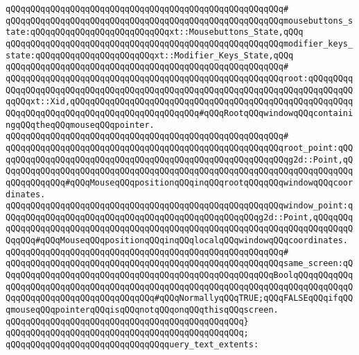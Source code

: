 \verb|qQQqqQQqqQQqqQQqqQQqqQQqqQQqqQQqqQQqqQQqqQQqqQQqqQQqqQQq#|\newline
\verb|qQQqqQQqqQQqqQQqqQQqqQQqqQQqqQQqqQQqqQQqqQQqqQQqqQQqqQQqmousebuttons_state:qQQqqQQqqQQqqQQqqQQqqQQqqQQqxt::Mousebuttons_State,qQQq|\newline
\verb|qQQqqQQqqQQqqQQqqQQqqQQqqQQqqQQqqQQqqQQqqQQqqQQqqQQqqQQqmodifier_keys_state:qQQqqQQqqQQqqQQqqQQqqQQqxt::Modifier_Keys_State,qQQq|\newline
\verb|qQQqqQQqqQQqqQQqqQQqqQQqqQQqqQQqqQQqqQQqqQQqqQQqqQQqqQQq#|\newline
\verb|qQQqqQQqqQQqqQQqqQQqqQQqqQQqqQQqqQQqqQQqqQQqqQQqqQQqqQQqroot:qQQqqQQqqQQqqQQqqQQqqQQqqQQqqQQqqQQqqQQqqQQqqQQqqQQqqQQqqQQqqQQqqQQqqQQqqQQqqQQqqQQqxt::Xid,qQQqqQQqqQQqqQQqqQQqqQQqqQQqqQQqqQQqqQQqqQQqqQQqqQQqqQQqqQQqqQQqqQQqqQQqqQQqqQQqqQQqqQQqqQQqqQQq#qQQqRootqQQqwindowqQQqcontainingqQQqtheqQQqmouseqQQqpointer.|\newline
\verb|qQQqqQQqqQQqqQQqqQQqqQQqqQQqqQQqqQQqqQQqqQQqqQQqqQQqqQQq#|\newline
\verb|qQQqqQQqqQQqqQQqqQQqqQQqqQQqqQQqqQQqqQQqqQQqqQQqqQQqqQQqroot_point:qQQqqQQqqQQqqQQqqQQqqQQqqQQqqQQqqQQqqQQqqQQqqQQqqQQqqQQqqQQqg2d::Point,qQQqqQQqqQQqqQQqqQQqqQQqqQQqqQQqqQQqqQQqqQQqqQQqqQQqqQQqqQQqqQQqqQQqqQQqqQQqqQQqqQQq#qQQqMouseqQQqpositionqQQqinqQQqrootqQQqqQQqwindowqQQqcoordinates.|\newline
\verb|qQQqqQQqqQQqqQQqqQQqqQQqqQQqqQQqqQQqqQQqqQQqqQQqqQQqqQQqwindow_point:qQQqqQQqqQQqqQQqqQQqqQQqqQQqqQQqqQQqqQQqqQQqqQQqqQQqg2d::Point,qQQqqQQqqQQqqQQqqQQqqQQqqQQqqQQqqQQqqQQqqQQqqQQqqQQqqQQqqQQqqQQqqQQqqQQqqQQqqQQqqQQq#qQQqMouseqQQqpositionqQQqinqQQqlocalqQQqwindowqQQqcoordinates.|\newline
\verb|qQQqqQQqqQQqqQQqqQQqqQQqqQQqqQQqqQQqqQQqqQQqqQQqqQQqqQQq#|\newline
\verb|qQQqqQQqqQQqqQQqqQQqqQQqqQQqqQQqqQQqqQQqqQQqqQQqqQQqqQQqsame_screen:qQQqqQQqqQQqqQQqqQQqqQQqqQQqqQQqqQQqqQQqqQQqqQQqqQQqqQQqBoolqQQqqQQqqQQqqQQqqQQqqQQqqQQqqQQqqQQqqQQqqQQqqQQqqQQqqQQqqQQqqQQqqQQqqQQqqQQqqQQqqQQqqQQqqQQqqQQqqQQqqQQqqQQqqQQq#qQQqNormallyqQQqTRUE;qQQqFALSEqQQqifqQQqmouseqQQqpointerqQQqisqQQqnotqQQqonqQQqthisqQQqscreen.|\newline
\verb|qQQqqQQqqQQqqQQqqQQqqQQqqQQqqQQqqQQqqQQqqQQqqQQq}|\newline
\verb|qQQqqQQqqQQqqQQqqQQqqQQqqQQqqQQqqQQqqQQqqQQqqQQq;|\newline
\newline
\verb|qQQqqQQqqQQqqQQqqQQqqQQqqQQqqQQqquery_text_extents:|\newline
